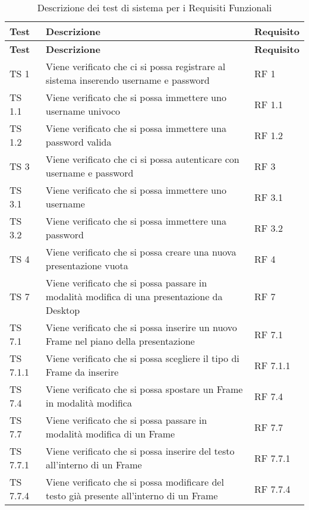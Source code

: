 {{	
		\renewcommand*{\arraystretch}{1.5}
		\begin{longtable} [c]{| p{3cm} | p{6cm} |p{5cm}|}
			\caption{Descrizione dei test di sistema per i Requisiti Funzionali
			 \label{tab:verReqFunz}}\\
			 \hline
			 \textbf{Test} & \textbf{Descrizione} & \textbf{Requisito} \\
			 \hline
			 \endfirsthead
			 \hline
			 \textbf{Test} & \textbf{Descrizione} & \textbf{Requisito} \\
			 \hline
			\endhead
			 \hline
			 \endfoot
			 \hline
			 \endlastfoot
			TS 1 & Viene verificato che ci si possa registrare al sistema inserendo username e password & RF 1\\
			\hline
			TS 1.1 & Viene verificato che si possa immettere uno username univoco & RF 1.1\\
			\hline
			TS 1.2 & Viene verificato che si possa immettere una password valida & RF 1.2\\
			\hline
			TS 3 & Viene verificato che ci si possa autenticare con username e password & RF 3\\
			\hline
			TS 3.1 & Viene verificato che si possa immettere uno username & RF 3.1\\
			\hline
			TS 3.2 & Viene verificato che si possa immettere una password & RF 3.2\\
			\hline
			TS 4 & Viene verificato che si possa creare una nuova presentazione vuota & RF 4\\
			\hline
			TS 7 & Viene verificato che si possa passare in modalità modifica di una presentazione da Desktop\ped{g} & RF 7\\
			\hline
			TS 7.1 & Viene verificato che si possa inserire un nuovo Frame\ped{g} nel piano della presentazione\ped{g} & RF 7.1\\
			\hline
			TS 7.1.1 & Viene verificato che si possa scegliere il tipo di Frame\ped{g} da inserire & RF 7.1.1\\
			\hline
			TS 7.4 & Viene verificato che si possa spostare un Frame\ped{g} in modalità modifica & RF 7.4\\
			\hline
			TS 7.7 & Viene verificato che si possa passare in modalità modifica di un Frame\ped{g} & RF 7.7\\
			\hline
			TS 7.7.1 & Viene verificato che si possa inserire del testo all'interno di un Frame\ped{g} & RF 7.7.1\\
			\hline
			TS 7.7.4 & Viene verificato che si possa modificare del testo già presente all'interno di un Frame\ped{g} & RF 7.7.4\\

\end{longtable}}}

